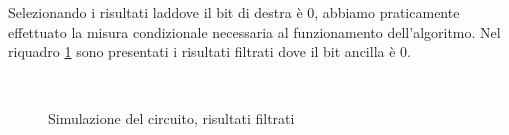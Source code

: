 Selezionando i risultati laddove il bit di destra è 0, abbiamo praticamente effettuato 
la misura condizionale necessaria al funzionamento dell'algoritmo. 
Nel riquadro \ref{fig:simulazione_filtrati} sono presentati 
i risultati filtrati dove il bit ancilla è 0. 

\begin{figure}[h!]
    \myfloatalign
     \\
    \caption{Simulazione del circuito, risultati filtrati}
    \label{fig:simulazione_filtrati}
\end{figure}

